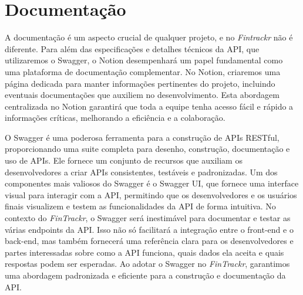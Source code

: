 \section{Documentação}

A documentação é um aspecto crucial de qualquer projeto, e no \textit{Fintrackr} não é diferente. Para além das especificações e detalhes técnicos da API, que utilizaremos o Swagger, o Notion desempenhará um papel fundamental como uma plataforma de documentação complementar. No Notion, criaremos uma página dedicada para manter informações pertinentes do projeto, incluindo eventuais documentações que auxiliem no desenvolvimento. Esta abordagem centralizada no Notion garantirá que toda a equipe tenha acesso fácil e rápido a informações críticas, melhorando a eficiência e a colaboração.

O Swagger é uma poderosa ferramenta para a construção de APIs RESTful, proporcionando uma suite completa para desenho, construção, documentação e uso de APIs. Ele fornece um conjunto de recursos que auxiliam os desenvolvedores a criar APIs consistentes, testáveis e padronizadas. Um dos componentes mais valiosos do Swagger é o Swagger UI, que fornece uma interface visual para interagir com a API, permitindo que os desenvolvedores e os usuários finais visualizem e testem as funcionalidades da API de forma intuitiva. No contexto do \textit{FinTrackr}, o Swagger será inestimável para documentar e testar as várias endpoints da API. Isso não só facilitará a integração entre o front-end e o back-end, mas também fornecerá uma referência clara para os desenvolvedores e partes interessadas sobre como a API funciona, quais dados ela aceita e quais respostas podem ser esperadas. Ao adotar o Swagger no \textit{FinTrackr}, garantimos uma abordagem padronizada e eficiente para a construção e documentação da API.
